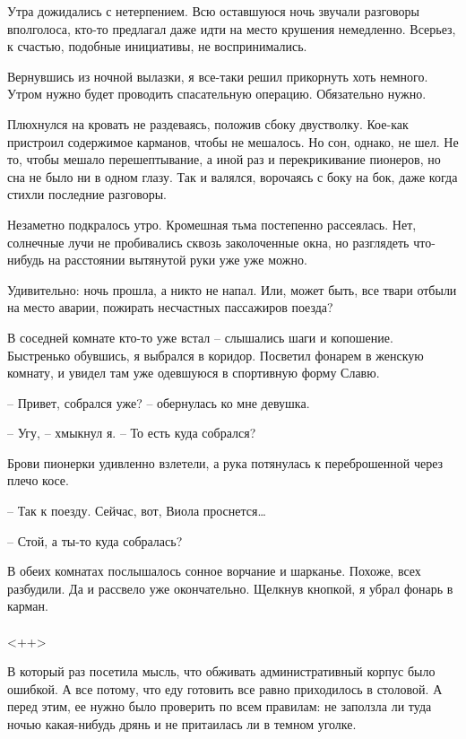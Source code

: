 \documentclass[a4paper]{book}
\begin{document}
Утра дожидались с нетерпением. Всю оставшуюся ночь звучали разговоры вполголоса, кто-то предлагал даже идти на место крушения немедленно. Всерьез, к счастью, подобные инициативы, не воспринимались.

Вернувшись из ночной вылазки, я все-таки решил прикорнуть хоть немного. Утром нужно будет проводить спасательную операцию. Обязательно нужно. 

Плюхнулся на кровать не раздеваясь, положив сбоку двустволку. Кое-как пристроил содержимое карманов, чтобы не мешалось. Но сон, однако, не шел. Не то, чтобы мешало перешептывание, а иной раз и перекрикивание пионеров, но сна не было ни в одном глазу. Так и валялся, ворочаясь с боку на бок, даже когда стихли последние разговоры. 

Незаметно подкралось утро. Кромешная тьма постепенно рассеялась. Нет, солнечные лучи не пробивались сквозь заколоченные окна, но разглядеть что-нибудь на расстоянии вытянутой руки уже уже можно.

Удивительно: ночь прошла, а никто не напал. Или, может быть, все твари отбыли на место аварии, пожирать несчастных пассажиров поезда?

В соседней комнате кто-то уже встал -- слышались шаги и копошение. Быстренько обувшись, я выбрался в коридор. Посветил фонарем в женскую комнату, и увидел там уже одевшуюся в спортивную форму Славю.

-- Привет, собрался уже? -- обернулась ко мне девушка.

-- Угу, -- хмыкнул я. -- То есть куда собрался?

Брови пионерки удивленно взлетели, а рука потянулась к переброшенной через плечо косе. 

-- Так к поезду. Сейчас, вот, Виола проснется\ldots

-- Стой, а ты-то куда собралась?

В обеих комнатах послышалось сонное ворчание и шарканье. Похоже, всех разбудили. Да и рассвело уже окончательно. Щелкнув кнопкой, я убрал фонарь в карман.

\paragraph{}<++>

В который раз посетила мысль, что обживать административный корпус было ошибкой. А все потому, что еду готовить все равно приходилось в столовой. А перед этим, ее нужно было проверить по всем правилам: не заползла ли туда ночью какая-нибудь дрянь и не притаилась ли в темном уголке. 
\end{document}
